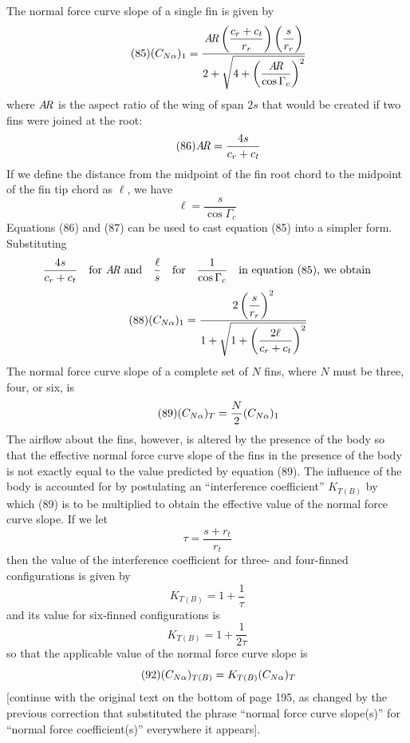 The normal force curve slope of a single fin is given by
\begin{equation*}\tag{85}
(C_{N\alpha})_1 = \frac{\mathit{A\mkern-3mu R}\left(\dfrac{c_r + c_t}{r_r}\right)\left(\dfrac{s}{r_r}\right)}{2 + \sqrt{4 + \left(\dfrac{\mathit{A\mkern-3mu R}}{\cos\Gamma_c}\right)^{2}}}
\end{equation*}
where $\mathit{A\mkern-3mu R}$ is the aspect ratio of the wing of span $2s$ that would be created
if two fins were joined at the root:
\begin{equation*}\tag{86}
\mathit{A\mkern-3mu R} = \frac{4s}{c_r + c_t}
\end{equation*}
If we define the distance from the midpoint of the fin root chord to the
midpoint of the fin tip chord as $\ell$, we have
\begin{equation*}\tag{87}
\ell = \frac{s}{\cos\Gamma_c}
\end{equation*}
Equations (86) and (87) can be used to cast equation (85) into a simpler form.
Substituting
\begin{equation*}
\frac{4s}{c_r + c_t}\quad\text{for $\mathit{A\mkern-3mu R}$ and}\quad\frac{\ell}{s}\quad\text{for}\quad\frac{1}{\cos\Gamma_c}\quad\text{in equation (85), we obtain}
\end{equation*}
\begin{equation*}\tag{88}
(C_{N\alpha})_1 = \frac{2\left(\dfrac{s}{r_r}\right)^{2}}{1 + \sqrt{1 + \left(\dfrac{2\ell}{c_r + c_t}\right)^{2}}}
\end{equation*}
The normal force curve slope of a complete set of $N$ fins, where $N$ must be
three, four, or six, is
\begin{equation*}\tag{89}
(C_{N\alpha})_T = \frac{N}{2}(C_{N\alpha})_1
\end{equation*}
The airflow about the fins, however, is altered by the presence of the body so
that the effective normal force curve slope of the fins in the presence of the
body is not exactly equal to the value predicted by equation (89). The
influence of the body is accounted for by postulating an ``interference
coefficient'' $K_{T(B)}$ by which (89) is to be multiplied to obtain the
effective value of the normal force curve slope. If we let
\begin{equation*}
\tau = \frac{s + r_t}{r_t}
\end{equation*}
then the value of the interference coefficient for three- and four-finned
configurations is given by
\begin{equation*}\tag{90}
K_{T(B)} = 1 + \frac{1}{\tau}
\end{equation*}
and its value for six-finned configurations is
\begin{equation*}\tag{91}
K_{T(B)} = 1 + \frac{1}{2\tau}
\end{equation*}
so that the applicable value of the normal force curve slope is
\begin{equation*}\tag{92}
(C_{N\alpha})_{T(B)} = K_{T(B)}(C_{N\alpha})_T
\end{equation*}
[continue with the original text on the bottom of page 195, as changed by the
previous correction that substituted the phrase ``normal force curve slope(s)''
for ``normal force coefficient(s)'' everywhere it appears].

